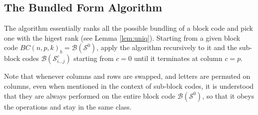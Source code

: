 \documentclass[12pt]{article}  %
\begin{document}
\subsection{The Bundled Form Algorithm}

The algorithm essentially ranks all the possible bundling of a block code and pick one with the higest rank (see Lemma \ref{lem:uniq}). Starting from a given block code $BC(n,p,k)_b=\mathcal{B}(\mathcal{S}^0)$, apply the algorithm recursively to it and the sub-block codes $\mathcal{B}(\mathcal{S}^c_{i\dots j})$ starting from $c=0$ until it terminates at column $c=p$.

Note that whenever columns and rows are swapped, and letters are permuted on columns, even when mentioned in the context of sub-block codes, it is understood that they are always performed on the entire block code $\mathcal{B}(\mathcal{S}^0)$, so that it obeys the operations and stay in the same class.
\end{document}
